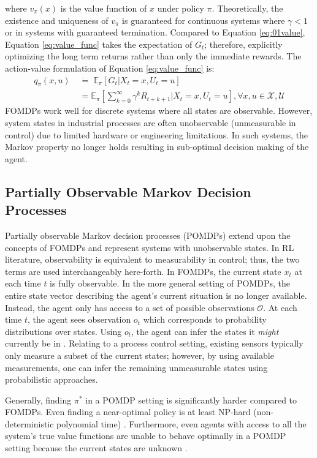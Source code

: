 where $v_\pi (x)$ is the value function of $x$ under policy $\pi$. Theoretically, the existence and uniqueness of $v_{\pi}$ is guaranteed for continuous systems where $\gamma < 1$ or in systems with guaranteed termination.  Compared to Equation \ref{eq:01value}, Equation \ref{eq:value_func} takes the expectation of $G_t$; therefore, explicitly optimizing the long term returns rather than only the immediate rewards. The action-value formulation of Equation \ref{eq:value_func} is:
\begin{align}
    q_\pi (x, u) \; &\dot{=} \; \mathbb{E}_\pi [G_t | X_t = x, U_t = u] \\
                 &= \mathbb{E}_\pi \left[\sum\limits^\infty_{k=0} \gamma^k R_{t+k+1} | X_t = x, U_t = u \right], \forall x, u \in \mathcal{X, U}
    \label{eq:a_value_func}
\end{align}
FOMDPs work well for discrete systems where all states are observable.  However, system states in industrial processes are often unobservable (unmeasurable in control) due to limited hardware or engineering limitations. In such systems, the Markov property no longer holds resulting in sub-optimal decision making of the agent.





\subsection{Partially Observable Markov Decision Processes}
Partially observable Markov decision processes (POMDPs) extend upon the concepts of FOMDPs and represent systems with unobservable states. In RL literature, observability is equivalent to measurability in control; thus, the two terms are used interchangeably here-forth. In FOMDPs, the current state $x_t$ at each time $t$ is fully observable. In the more general setting of POMDPs, the entire state vector describing the agent's current situation is no longer available. Instead, the agent only has access to a set of possible observations $\mathcal{O}$. At each time $t$, the agent sees observation $o_t$ which corresponds to probability distributions over states.  Using $o_t$, the agent can infer the states it \textit{might} currently be in \cite{ng_ref12}. Relating to a process control setting, existing sensors typically only measure a subset of the current states; however, by using available measurements, one can infer the remaining unmeasurable states using probabilistic approaches.

Generally, finding $\pi^*$ in a POMDP setting is significantly harder compared to FOMDPs.  Even finding a near-optimal policy is at least NP-hard (non-deterministic polynomial time) \cite{pomdp_time}.  Furthermore, even agents with access to all the system's true value functions are unable to behave optimally in a POMDP setting because the current states are unknown \cite{ng_ref12}. 


